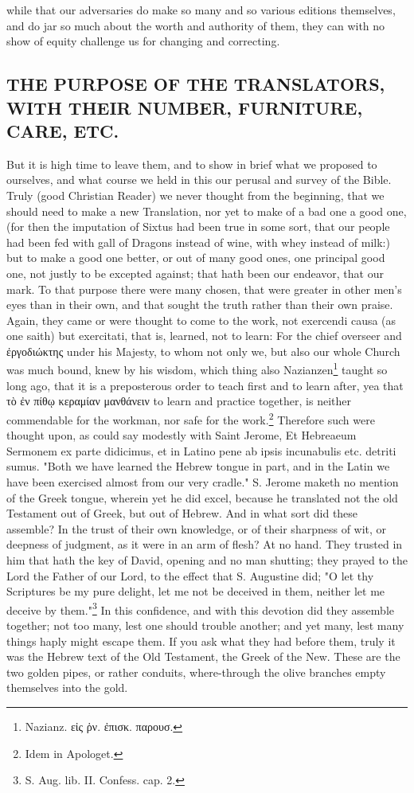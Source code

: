 while that our adversaries do make so many and so various editions themselves, and do jar so much about the worth and authority of them, they can with no show of equity challenge us for changing and correcting.

\subsection{THE PURPOSE OF THE TRANSLATORS, WITH THEIR NUMBER, FURNITURE, CARE, ETC.}

But it is high time to leave them, and to show in brief what we proposed to ourselves, and what course we held in this our perusal and survey of the Bible. Truly (good Christian Reader) we never thought from the beginning, that we should need to make a new Translation, nor yet to make of a bad one a good one, (for then the imputation of Sixtus had been true in some sort, that our people had been fed with gall of Dragons instead of wine, with whey instead of milk:) but to make a good one better, or out of many good ones, one principal good one, not justly to be excepted against; that hath been our endeavor, that our mark. To that purpose there were many chosen, that were greater in other men's eyes than in their own, and that sought the truth rather than their own praise. Again, they came or were thought to come to the work, not exercendi causa (as one saith) but exercitati, that is, learned, not to learn: For the chief overseer and \foreignlanguage{greek}{ἐργοδιώκτης} under his Majesty, to whom not only we, but also our whole Church was much bound, knew by his wisdom, which thing also Nazianzen\footnote{Nazianz. \foreignlanguage{greek}{εἰς ῥν. ἐπισκ. παρουσ.}} taught so long ago, that it is a preposterous order to teach first and to learn after, yea that \foreignlanguage{greek}{τὸ ἐν πίθῳ κεραμίαν μανθάνειν} to learn and practice together, is neither commendable for the workman, nor safe for the work.\footnote{Idem in Apologet.} Therefore such were thought upon, as could say modestly with Saint Jerome, Et Hebreaeum Sermonem ex parte didicimus, et in Latino pene ab ipsis incunabulis etc. detriti sumus. "Both we have learned the Hebrew tongue in part, and in the Latin we have been exercised almost from our very cradle." S. Jerome maketh no mention of the Greek tongue, wherein yet he did excel, because he translated not the old Testament out of Greek, but out of Hebrew. And in what sort did these assemble? In the trust of their own knowledge, or of their sharpness of wit, or deepness of judgment, as it were in an arm of flesh? At no hand. They trusted in him that hath the key of David, opening and no man shutting; they prayed to the Lord the Father of our Lord, to the effect that S. Augustine did; "O let thy Scriptures be my pure delight, let me not be deceived in them, neither let me deceive by them."\footnote{S. Aug. lib. II. Confess. cap. 2.} In this confidence, and with this devotion did they assemble together; not too many, lest one should trouble another; and yet many, lest many things haply might escape them. If you ask what they had before them, truly it was the Hebrew text of the Old Testament, the Greek of the New. These are the two golden pipes, or rather conduits, where-through the olive branches empty themselves into the gold. 